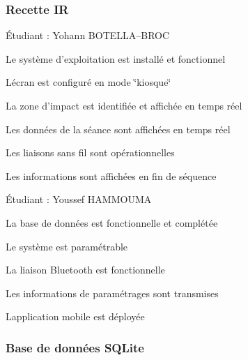 \subsubsection*{Recette IR}


\begin{DoxyItemize}
\item Étudiant \+: Yohann B\+O\+T\+E\+L\+LA--B\+R\+OC
\begin{DoxyItemize}
\item Le système d’exploitation est installé et fonctionnel
\item L\textquotesingle{}écran est configuré en mode \char`\"{}kiosque\char`\"{}
\item La zone d’impact est identifiée et affichée en temps réel
\item Les données de la séance sont affichées en temps réel
\item Les liaisons sans fil sont opérationnelles
\item Les informations sont affichées en fin de séquence
\end{DoxyItemize}
\item Étudiant \+: Youssef H\+A\+M\+M\+O\+U\+MA
\begin{DoxyItemize}
\item La base de données est fonctionnelle et complétée
\item Le système est paramétrable
\item La liaison Bluetooth est fonctionnelle
\item Les informations de paramétrages sont transmises
\item L\textquotesingle{}application mobile est déployée
\end{DoxyItemize}
\end{DoxyItemize}

\subsubsection*{Base de données S\+Q\+Lite}


